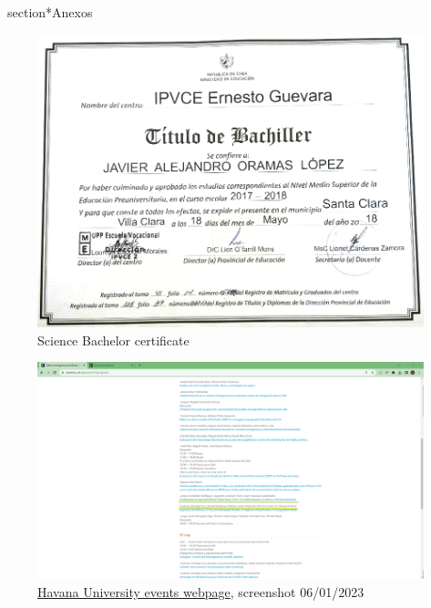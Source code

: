 \documentclass{article}
\begin{document}
\newpage
\
section*{Anexos}
\begin{figure}[h]
    \includegraphics[width=\textwidth]{images/bachelor.png}
    \caption{Science Bachelor certificate}
    \label{sec:bachelor}
\end{figure}

\begin{figure}[h]
    \includegraphics[width=\textwidth]{images/ai_workshop.png}
    \caption{\href{https://eventos.uh.cu/event/7/program}{Havana University events webpage}, screenshot 06/01/2023}
    \label{sec:workshop}
\end{figure}
\end{document}
